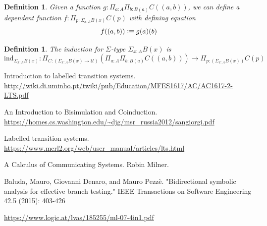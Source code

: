 \documentclass{article}
\newtheorem{definition}[theorem]{Definition}
\newcommand{\defeqv}{\vcentcolon\equiv}
\begin{document}
\begin{definition}
\rm Given a function $g:\Pi_{a:A}\Pi_{b:B(a)} C((a,b))$, we can define a dependent function $f: \Pi_{p:\Sigma_{x:A} B(x)} C(p)$ with defining equation
\[
    f((a,b)) \defeqv g(a)(b)
\]
\end{definition}

\begin{definition}
\rm The induction for $\Sigma$-type $\Sigma_{x:A}B(x)$ is 
\[ 
    \text{ind}_{\Sigma_{x:A}B(x)}: \Pi_{C:(\Sigma_{x:A}B(x) \to \mathcal{U})}(\Pi_{a:A}\Pi_{b:B(a)} C((a,b))) \to \Pi_{p:(\Sigma_{x:A}B(x))} C(p) 
\]
\end{definition}

\newpage
\begin{thebibliography}{9}
Introduction to labelled transition systems. \newline\url{http://wiki.di.uminho.pt/twiki/pub/Education/MFES1617/AC/AC1617-2-LTS.pdf}

An Introduction to Bisimulation and Coinduction. \newline\url{https://homes.cs.washington.edu/~djg/msr_russia2012/sangiorgi.pdf}

Labelled transition systems. \newline\url{https://www.mcrl2.org/web/user_manual/articles/lts.html}


A Calculus of Communicating Systems. Robin Milner. 

Baluda, Mauro, Giovanni Denaro, and Mauro Pezzè. "Bidirectional symbolic analysis for effective branch testing." IEEE Transactions on Software Engineering 42.5 (2015): 403-426

\url{https://www.logic.at/lvas/185255/ml-07-4in1.pdf}
\end{thebibliography}
\end{document}
